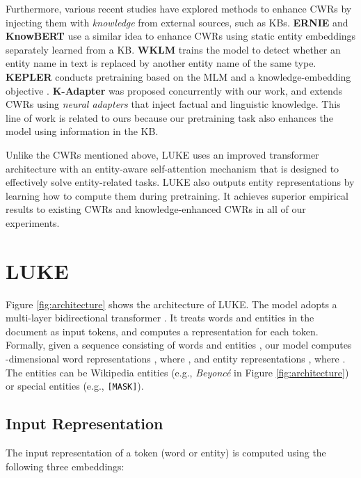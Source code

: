 \documentclass[11pt,a4paper]{article}
\begin{document}
Furthermore, various recent studies have explored methods to enhance CWRs by injecting them with \textit{knowledge} from external sources, such as KBs.
\textbf{ERNIE} \cite{Zhang2019} and \textbf{KnowBERT} \cite{peters-knowbert} use a similar idea to enhance CWRs using static entity embeddings separately learned from a KB.
\textbf{WKLM} \cite{Xiong2020Pretrained} trains the model to detect whether an entity name in text is replaced by another entity name of the same type.
\textbf{KEPLER} \cite{wang2019kepler} conducts pretraining based on the MLM and a knowledge-embedding objective  \cite{Bordes2013}.
\textbf{K-Adapter} \cite{wang2020k} was proposed concurrently with our work, and extends CWRs using \textit{neural adapters} that inject factual and linguistic knowledge.
This line of work is related to ours because our pretraining task also enhances the model using information in the KB.

Unlike the CWRs mentioned above, LUKE uses an improved transformer architecture with an entity-aware self-attention mechanism that is designed to effectively solve entity-related tasks.
LUKE also outputs entity representations by learning how to compute them during pretraining.
It achieves superior empirical results to existing CWRs and knowledge-enhanced CWRs in all of our experiments.

\section{LUKE}

Figure \ref{fig:architecture} shows the architecture of LUKE.
The model adopts a multi-layer bidirectional transformer \cite{NIPS2017_7181}.
It treats words and entities in the document as input tokens, and computes a representation for each token.
Formally, given a sequence consisting of  words  and  entities , our model computes -dimensional word representations , where , and entity representations , where .
The entities can be Wikipedia entities (e.g., \textit{Beyoncé} in Figure \ref{fig:architecture}) or special entities (e.g., \texttt{[MASK]}).

\subsection{Input Representation}
\label{sec:input_repr}

The input representation of a token (word or entity) is computed using the following three embeddings:
\end{document}
